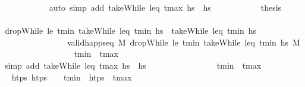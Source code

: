 \begin{isabellebody}
\ \ \ \ \ \ \ \ \ \ \isamarkupfalse%
\ {\isacharparenleft}{\kern0pt}auto\ simp\ add{\isacharcolon}{\kern0pt}\ {\isacartoucheopen}takeWhile\ {\isacharparenleft}{\kern0pt}leq\ t\isactrlsub m\isactrlsub a\isactrlsub x{\isacharparenright}{\kern0pt}\ hs\ {\isacharequal}{\kern0pt}\ hs{\isacartoucheclose}{\isacharparenright}{\kern0pt}\isanewline
\ \ \ \ \ \ \ \ \isamarkupfalse%
\ \isamarkupfalse%
\ {\isacharquery}{\kern0pt}thesis\isanewline
\ \ \ \ \ \ \ \ \ \ \isamarkupfalse%
\ {\isacartoucheopen}dropWhile\ {\isacharparenleft}{\kern0pt}le\ t\isactrlsub m\isactrlsub i\isactrlsub n{\isacharparenright}{\kern0pt}\ {\isacharparenleft}{\kern0pt}takeWhile\ {\isacharparenleft}{\kern0pt}leq\ t\isactrlsub m\isactrlsub i\isactrlsub n{\isacharparenright}{\kern0pt}\ hs{\isacharparenright}{\kern0pt}\ {\isacharequal}{\kern0pt}\ takeWhile\ {\isacharparenleft}{\kern0pt}leq\ t\isactrlsub m\isactrlsub i\isactrlsub n{\isacharparenright}{\kern0pt}\ hs{\isacartoucheclose}\isanewline
\ \ \ \ \ \ \ \ \ \ \ \ \ \ \ \ {\isacartoucheopen}valid{\isacharunderscore}{\kern0pt}happ{\isacharunderscore}{\kern0pt}seq\ M\ {\isacharparenleft}{\kern0pt}dropWhile\ {\isacharparenleft}{\kern0pt}le\ t\isactrlsub m\isactrlsub i\isactrlsub n{\isacharparenright}{\kern0pt}\ {\isacharparenleft}{\kern0pt}takeWhile\ {\isacharparenleft}{\kern0pt}leq\ t\isactrlsub m\isactrlsub i\isactrlsub n{\isacharparenright}{\kern0pt}\ hs{\isacharparenright}{\kern0pt}{\isacharparenright}{\kern0pt}\ M\ \isanewline
\ \ \ \ \ \ \ \ \ \ \ \ \ \ \ \ {\isacartoucheopen}t\isactrlsub m\isactrlsub i\isactrlsub n\ {\isacharequal}{\kern0pt}\ t\isactrlsub m\isactrlsub a\isactrlsub x{\isacartoucheclose}\isanewline
\ \ \ \ \ \ \ \ \ \ \isamarkupfalse%
\ {\isacharparenleft}{\kern0pt}simp\ add{\isacharcolon}{\kern0pt}\ {\isacartoucheopen}takeWhile\ {\isacharparenleft}{\kern0pt}leq\ t\isactrlsub m\isactrlsub a\isactrlsub x{\isacharparenright}{\kern0pt}\ hs\ {\isacharequal}{\kern0pt}\ hs{\isacartoucheclose}{\isacharparenright}{\kern0pt}\isanewline
\ \ \ \ \ \ \isamarkupfalse%
\isanewline
\ \ \ \ \ \ \ \ \isamarkupfalse%
\ {\isachardoublequoteopen}t\isactrlsub m\isactrlsub i\isactrlsub n\ {\isacharless}{\kern0pt}\ t\isactrlsub m\isactrlsub a\isactrlsub x{\isachardoublequoteclose}\isanewline
\ \ \ \ \ \ \ \ \isamarkupfalse%
\ \isamarkupfalse%
\ {\isachardoublequoteopen}{\isasymexists}htps{\isacharprime}{\kern0pt}{\isachardot}{\kern0pt}\ htps\ {\isacharequal}{\kern0pt}\ {\isacharbrackleft}{\kern0pt}{\isacharbrackright}{\kern0pt}\ {\isacharat}{\kern0pt}\ t\isactrlsub m\isactrlsub i\isactrlsub n\ {\isacharhash}{\kern0pt}\ htps{\isacharprime}{\kern0pt}\ {\isacharat}{\kern0pt}\ t\isactrlsub m\isactrlsub a\isactrlsub x\ {\isacharhash}{\kern0pt}\ {\isacharbrackleft}{\kern0pt}{\isacharbrackright}{\kern0pt}{\isachardoublequoteclose}\isanewline

\end{isabellebody}
